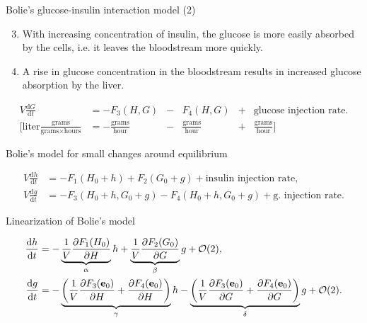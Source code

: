 \documentclass{beamer}
\providecommand{\m}[1]{\ensuremath{\mathrm{#1}}}
\providecommand{\p}[1]{\ensuremath{\partial #1}}
\begin{document}
\begin{frame}{Bolie's glucose-insulin interaction model (2)}

\begin{enumerate}
\setcounter{enumi}{2}
	\item
	With increasing concentration of insulin, the glucose is more easily absorbed by the cells, i.e. it leaves the bloodstream more quickly.
	\item
	A rise in glucose concentration in the bloodstream results in increased glucose absorption by the liver.
\end{enumerate}

\begin{align*}
V\frac{\m{d} G}{\m{d} t}&=-F_3(H,G)&-&F_4(H,G) &+&\text{glucose injection rate}.\\
\Bigg[\text{liter}\frac{\text{grams}}{\text{grams} \times\text{hours}}&=-\frac{\text{grams}}{\text{hour}}&-&\frac{\text{grams}}{\text{hour}}&+&\frac{\text{grams}}{\text{hour}}\Bigg]
\end{align*}


\end{frame}

\begin{frame}{Bolie's model for small changes around equilibrium}

\begin{equation*}
\begin{aligned}
V\frac{\m{d}h}{\m{d}t}&=-F_1(H_0+h)+F_2(G_0+g)+ \text{insulin injection rate},\\
V\frac{\m{d}g}{\m{d}t}&=-F_3(H_0+h,G_0+g)-F_4(H_0+h,G_0+g)+ \text{g. injection rate}.
\end{aligned}
\end{equation*}
\end{frame}

\begin{frame}{Linearization of Bolie's model}


\begin{align*}
\frac{\m{d}h}{\m{d}t}&=-\underbrace{%
		\frac{1}{V}\frac{\p F_1(H_0)}{\p H}}_{\alpha}h+%
%
\underbrace{%
		\frac{1}{V}\frac{\p F_2(G_0)}{\p G}}_{\beta}g+\mathcal{O}(2), \\%
%
\frac{\m{d}g}{\m{d}t}&=%
%
-\underbrace{%
\left(\frac{1}{V}\frac{\p F_3(\mathbf{e}_0)}{\p H}+\frac{\p F_4(\mathbf{e}_0)}{\p H}\right)}_{\gamma}h%
-\underbrace{%
\left(\frac{1}{V}\frac{\p F_3(\mathbf{e}_0)}{\p G}+\frac{\p F_4(\mathbf{e}_0)}{\p G}\right)}_{\delta} g+\mathcal{O}(2).
\end{align*}


\end{frame}
\end{document}
